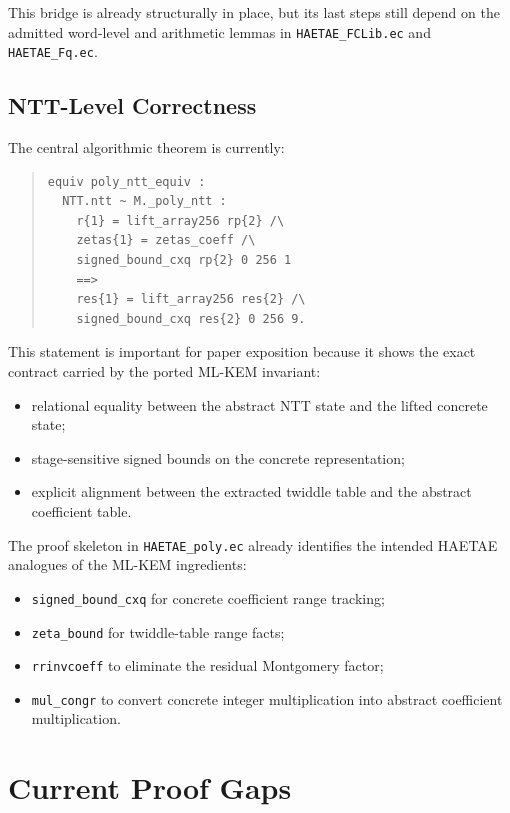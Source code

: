 \documentclass[11pt]{article}
\newcommand{\file}[1]{\texttt{#1}}
\newcommand{\ec}[1]{\texttt{#1}}
\begin{document}
This bridge is already structurally in place, but its last steps still depend
on the admitted word-level and arithmetic lemmas in \file{HAETAE\_FCLib.ec} and
\file{HAETAE\_Fq.ec}.

\subsection{NTT-Level Correctness}

The central algorithmic theorem is currently:
\begin{quote}
\begin{verbatim}
equiv poly_ntt_equiv :
  NTT.ntt ~ M._poly_ntt :
    r{1} = lift_array256 rp{2} /\
    zetas{1} = zetas_coeff /\
    signed_bound_cxq rp{2} 0 256 1
    ==>
    res{1} = lift_array256 res{2} /\
    signed_bound_cxq res{2} 0 256 9.
\end{verbatim}
\end{quote}

This statement is important for paper exposition because it shows the exact
contract carried by the ported ML-KEM invariant:
\begin{itemize}[leftmargin=1.5em]
\item relational equality between the abstract NTT state and the lifted
      concrete state;
\item stage-sensitive signed bounds on the concrete representation;
\item explicit alignment between the extracted twiddle table and the abstract
      coefficient table.
\end{itemize}

The proof skeleton in \file{HAETAE\_poly.ec} already identifies the intended
HAETAE analogues of the ML-KEM ingredients:
\begin{itemize}[leftmargin=1.5em]
\item \ec{signed\_bound\_cxq} for concrete coefficient range tracking;
\item \ec{zeta\_bound} for twiddle-table range facts;
\item \ec{rrinvcoeff} to eliminate the residual Montgomery factor;
\item \ec{mul\_congr} to convert concrete integer multiplication into abstract
      coefficient multiplication.
\end{itemize}

\section{Current Proof Gaps}
\end{document}
